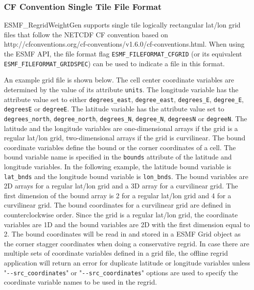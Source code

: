 \subsubsection{CF Convention Single Tile File Format}\label{sec:fileformat:gridspec}

ESMF\_RegridWeightGen supports single tile logically rectangular lat/lon grid files that follow the NETCDF CF convention based on
 {http://cfconventions.org/cf-conventions/v1.6.0/cf-conventions.html}. When using the ESMF API, the file format flag {\tt ESMF\_FILEFORMAT\_CFGRID} (or its equivalent {\tt ESMF\_FILEFORMAT\_GRIDSPEC}) can be used to indicate a file in this format.  

 An example grid file is shown below.
The cell center coordinate variables are determined by the value of its attribute {\tt units}.  The longitude
variable has the attribute value set to either {\tt degrees\_east}, {\tt degree\_east}, {\tt degrees\_E}, {\tt degree\_E},
{\tt degreesE} or {\tt degreeE}.  The latitude variable has the attribute value set to {\tt degrees\_north}, {\tt degree\_north}, {\tt degrees\_N},
{\tt degree\_N}, {\tt degreesN} or {\tt degreeN}.   The latitude and the longitude variables are one-dimensional arrays if the grid is a regular lat/lon grid, two-dimensional arrays if the grid is curvilinear. The bound coordinate
variables define the bound or the corner coordinates of a cell.  The bound variable name is specified in the
{\tt bounds} attribute of the latitude and longitude variables.  In the following example, the latitude bound
variable is {\tt lat\_bnds} and the longitude bound variable is {\tt lon\_bnds}.  The bound variables are 2D
arrays for a regular lat/lon grid and a 3D array for a curvilinear grid.  The first dimension of the bound
array is 2 for a regular lat/lon grid and 4 for a curvilinear grid.  The bound coordinates for a curvilinear
grid are defined in counterclockwise order. Since the grid is a regular lat/lon grid,
the coordinate variables are 1D and the bound variables are 2D with the first dimension equal to 2.
The bound coordinates will be read in and stored in a ESMF Grid object as the corner stagger coordinates when doing a conservative regrid.  In case there are multiple sets of coordinate variables defined in a grid file,
the offline regrid application will return an error for duplicate latitude or longitude variables unless
"{\tt \verb+--+src\_coordinates}" 
or "{\tt \verb+--+src\_coordinates}" options are used to specify the coordinate variable names
to be used in the regrid.


